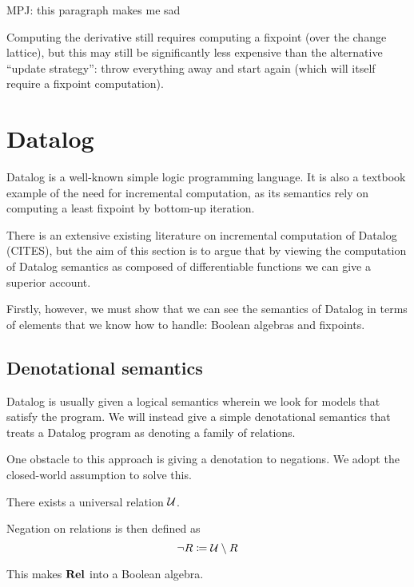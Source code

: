 MPJ: this paragraph makes me sad

Computing the derivative still requires computing a fixpoint (over the change
lattice), but this may still be significantly less expensive than the
alternative ``update strategy'': throw everything away and start
again (which will itself require a fixpoint computation).

\section{Datalog}
\label{sec:datalog}

Datalog is a well-known simple logic programming language. It is also a textbook
example of the need for incremental computation, as its semantics rely on
computing a least fixpoint by bottom-up iteration.

There is an extensive existing literature on incremental computation of Datalog
(CITES), but the aim of this section is to argue that by viewing the computation
of Datalog semantics as composed of differentiable functions we can give a
superior account.

Firstly, however, we must show that we can see the semantics of Datalog in terms
of elements that we know how to handle: Boolean algebras and fixpoints.

\subsection{Denotational semantics}

Datalog is usually given a logical semantics wherein we look for models that
satisfy the program. We will instead give a simple denotational semantics that treats a Datalog
program as denoting a family of relations.

One obstacle to this approach is giving a denotation to negations. We adopt the
closed-world assumption to solve this.

\begin{defn}
  There exists a universal relation $\mathcal{U}$.
  
  Negation on relations is then defined as $$\neg R \coloneqq \mathcal{U} \setminus R$$
\end{defn}

This makes $\mathbf{Rel}$ into a Boolean algebra.

